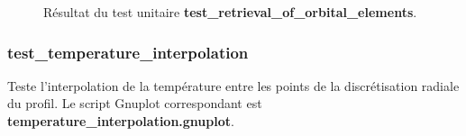 \begin{figure}[htbp]
\centering
{}\hfill
{}

\caption{Résultat du test unitaire \textbf{test\_retrieval\_of\_orbital\_elements}.}
\end{figure}

\subsubsection{test\_temperature\_interpolation}
Teste l'interpolation de la température entre les points de la discrétisation radiale du profil. Le script Gnuplot correspondant est \textbf{temperature\_interpolation.gnuplot}.

